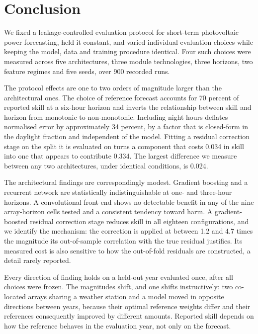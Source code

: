 \section{Conclusion}

We fixed a leakage-controlled evaluation protocol for short-term
photovoltaic power forecasting, held it constant, and varied individual
evaluation choices while keeping the model, data and training procedure
identical. Four such choices were measured across five architectures,
three module technologies, three horizons, two feature regimes and five
seeds, over 900 recorded runs.

The protocol effects are one to two orders of magnitude larger than the
architectural ones. The choice of reference forecast accounts for 70
percent of reported skill at a six-hour horizon and inverts the
relationship between skill and horizon from monotonic to non-monotonic.
Including night hours deflates normalised error by approximately 34
percent, by a factor that is closed-form in the daylight fraction and
independent of the model. Fitting a residual correction stage on the
split it is evaluated on turns a component that costs 0.034 in skill
into one that appears to contribute 0.334. The largest difference we
measure between any two architectures, under identical conditions, is
0.024.

The architectural findings are correspondingly modest. Gradient boosting
and a recurrent network are statistically indistinguishable at one- and
three-hour horizons. A convolutional front end shows no detectable
benefit in any of the nine array-horizon cells tested and a consistent
tendency toward harm. A gradient-boosted residual correction stage reduces skill
in all eighteen configurations, and we identify the mechanism: the
correction is applied at between 1.2 and 4.7 times the magnitude its
out-of-sample correlation with the true residual justifies. Its measured
cost is also sensitive to how the out-of-fold residuals are constructed,
a detail rarely reported.

Every direction of finding holds on a held-out year evaluated once,
after all choices were frozen. The magnitudes shift, and one shifts
instructively: two co-located arrays sharing a weather station and a
model moved in opposite directions between years, because their optimal
reference weights differ and their references consequently improved by
different amounts. Reported skill depends on how the reference behaves
in the evaluation year, not only on the forecast.

